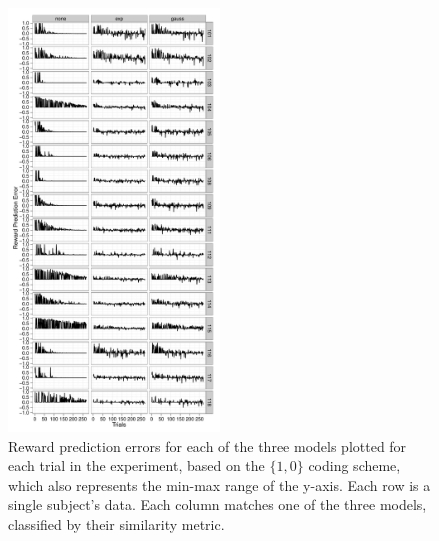 \begin{figure}[tp]
    \includegraphics[width=0.5\textwidth]{f_rpe_acc}
    \centering
    \caption{Reward prediction errors for each of the three models plotted for each trial in the experiment, based on the $\{1,0\}$ coding scheme, which also represents the min-max range of the y-axis.  Each row is a single subject's data.  Each column matches one of the three models, classified by their similarity metric.}
    \label{fig:rpeacc}
\end{figure}
